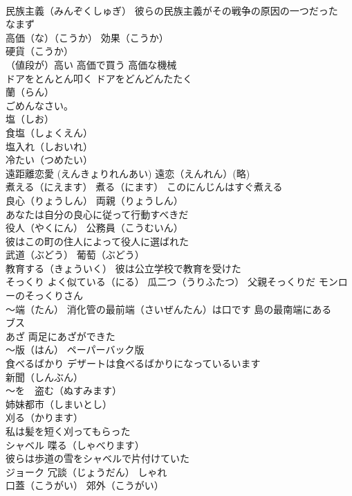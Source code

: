 \documentclass[8pt]{extreport}
\begin{document}
\begin{CJK}{UTF8}{min}
\\	民族主義（みんぞくしゅぎ） 彼らの民族主義がその戦争の原因の一つだった
\\	なまず
\\	高価（な）（こうか） 効果（こうか）
\\	硬貨（こうか）
\\	（値段が）高い 高価で買う 高価な機械
\\	ドアをとんとん叩く ドアをどんどんたたく
\\	蘭（らん）
\\	ごめんなさい。
\\	塩（しお） 
\\	食塩（しょくえん）
\\	塩入れ（しおいれ）
\\	冷たい（つめたい）
\\	遠距離恋愛 (えんきょりれんあい) 遠恋（えんれん）(略)
\\	煮える（にえます） 煮る（にます） このにんじんはすぐ煮える
\\	良心（りょうしん） 両親（りょうしん）
\\	あなたは自分の良心に従って行動すべきだ
\\	役人（やくにん） 公務員（こうむいん）
\\	彼はこの町の住人によって役人に選ばれた
\\	武道（ぶどう） 葡萄（ぶどう）
\\	教育する（きょういく） 彼は公立学校で教育を受けた
\\	そっくり よく似ている（にる） 瓜二つ（うりふたつ） 父親そっくりだ モンローのそっくりさん
\\	～端（たん） 消化管の最前端（さいぜんたん）は口です 島の最南端にある
\\	ブス 
\\	あざ 両足にあざができた
\\	～版（はん） ペーパーバック版
\\	食べるばかり デザートは食べるばかりになっているいます
\\	新聞（しんぶん）
\\	～を　盗む（ぬすみます）
\\	姉妹都市（しまいとし）
\\	刈る（かります）
\\	私は髪を短く刈ってもらった
\\	シャベル 喋る（しゃべります） 
\\	彼らは歩道の雪をシャベルで片付けていた
\\	ジョーク 冗談（じょうだん） しゃれ 
\\	口蓋（こうがい） 郊外（こうがい）

\end{CJK}
\end{document}
